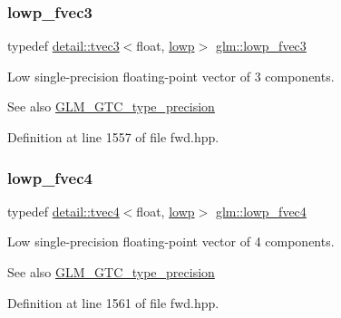 \subsubsection{\texorpdfstring{lowp\+\_\+fvec3}{lowp\_fvec3}}
{\footnotesize\ttfamily typedef \hyperlink{structglm_1_1detail_1_1tvec3}{detail\+::tvec3}$<$float, \hyperlink{namespaceglm_a0f04f086094c747d227af4425893f545ae161af3fc695e696ce3bf69f7332bc2d}{lowp}$>$ \hyperlink{group__gtc__type__precision_ga83d77dfe136d4add9e214cd205320c12}{glm\+::lowp\+\_\+fvec3}}

Low single-\/precision floating-\/point vector of 3 components. \begin{DoxySeeAlso}{See also}
\hyperlink{group__gtc__type__precision}{G\+L\+M\+\_\+\+G\+T\+C\+\_\+type\+\_\+precision} 
\end{DoxySeeAlso}


Definition at line 1557 of file fwd.\+hpp.

\mbox{\label{group__gtc__type__precision_ga0d016cdbff067c450122115d0620bf85}} 
\subsubsection{\texorpdfstring{lowp\+\_\+fvec4}{lowp\_fvec4}}
{\footnotesize\ttfamily typedef \hyperlink{structglm_1_1detail_1_1tvec4}{detail\+::tvec4}$<$float, \hyperlink{namespaceglm_a0f04f086094c747d227af4425893f545ae161af3fc695e696ce3bf69f7332bc2d}{lowp}$>$ \hyperlink{group__gtc__type__precision_ga0d016cdbff067c450122115d0620bf85}{glm\+::lowp\+\_\+fvec4}}

Low single-\/precision floating-\/point vector of 4 components. \begin{DoxySeeAlso}{See also}
\hyperlink{group__gtc__type__precision}{G\+L\+M\+\_\+\+G\+T\+C\+\_\+type\+\_\+precision} 
\end{DoxySeeAlso}


Definition at line 1561 of file fwd.\+hpp.

\mbox{\label{group__gtc__type__precision_gaf7bbfd31bcec25a416ea94d09efb5451}} 
